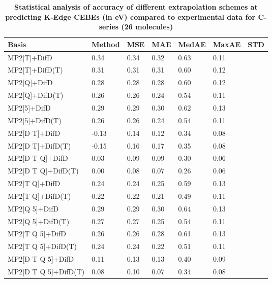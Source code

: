 \begin{table}
  \caption{\textbf{Statistical analysis of accuracy of different extrapolation schemes at predicting K-Edge CEBEs (in eV) compared to experimental data for C-series (26 molecules)}}
  \begin{tabular}{l l l l l l l }
    \toprule
    \textbf{Basis} & \textbf{Method} & \textbf{MSE} & \textbf{MAE} & \textbf{MedAE} & \textbf{MaxAE} & \textbf{STD} \\ 
    \midrule
    MP2[T]+DifD & 0.34 & 0.34 & 0.32 & 0.63 & 0.11 \\ 
    MP2[T]+DifD(T) & 0.31 & 0.31 & 0.31 & 0.60 & 0.12 \\ 
    MP2[Q]+DifD & 0.28 & 0.28 & 0.28 & 0.60 & 0.12 \\ 
    MP2[Q]+DifD(T) & 0.26 & 0.26 & 0.24 & 0.54 & 0.11 \\ 
    MP2[5]+DifD & 0.29 & 0.29 & 0.30 & 0.62 & 0.13 \\ 
    MP2[5]+DifD(T) & 0.26 & 0.26 & 0.24 & 0.54 & 0.11 \\ 
    MP2[D T]+DifD & -0.13 & 0.14 & 0.12 & 0.34 & 0.08 \\ 
    MP2[D T]+DifD(T) & -0.15 & 0.16 & 0.17 & 0.35 & 0.08 \\ 
    MP2[D T Q]+DifD & 0.03 & 0.09 & 0.09 & 0.30 & 0.06 \\ 
    MP2[D T Q]+DifD(T) & 0.00 & 0.08 & 0.07 & 0.26 & 0.06 \\ 
    MP2[T Q]+DifD & 0.24 & 0.24 & 0.25 & 0.59 & 0.13 \\ 
    MP2[T Q]+DifD(T) & 0.22 & 0.22 & 0.21 & 0.49 & 0.11 \\ 
    MP2[Q 5]+DifD & 0.29 & 0.29 & 0.30 & 0.64 & 0.13 \\ 
    MP2[Q 5]+DifD(T) & 0.27 & 0.27 & 0.25 & 0.54 & 0.11 \\ 
    MP2[T Q 5]+DifD & 0.26 & 0.26 & 0.28 & 0.61 & 0.13 \\ 
    MP2[T Q 5]+DifD(T) & 0.24 & 0.24 & 0.22 & 0.51 & 0.11 \\ 
    MP2[D T Q 5]+DifD & 0.11 & 0.13 & 0.13 & 0.40 & 0.09 \\ 
    MP2[D T Q 5]+DifD(T) & 0.08 & 0.10 & 0.07 & 0.34 & 0.08 \\ 
    \bottomrule
  \end{tabular}
\end{table}
